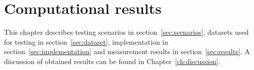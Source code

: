 \chapter{Computational results}\label{ch:computational-results}

This chapter describes testing scenarios in section~\ref{sec:scenarios},
datasets used for testing in section~\ref{sec:dataset},
implementation in section~\ref{sec:implementation} and
measurement results in section~\ref{sec:results}.
A discussion of obtained results can be found in Chapter~\ref{ch:discussion}.






